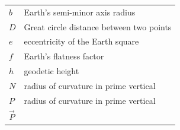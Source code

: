 \documentclass[
]{book}
\begin{document}
\begin{longtable}[]{@{}ll@{}}
\begin{minipage}[t]{0.43\columnwidth}
\(b\)\strut
\end{minipage} & \begin{minipage}[t]{0.51\columnwidth}\raggedright
Earth's semi-minor axis radius\strut
\end{minipage}\tabularnewline
\begin{minipage}[t]{0.43\columnwidth}\raggedright
\(D\)\strut
\end{minipage} & \begin{minipage}[t]{0.51\columnwidth}\raggedright
Great circle distance between two points\strut
\end{minipage}\tabularnewline
\begin{minipage}[t]{0.43\columnwidth}\raggedright
\(e\)\strut
\end{minipage} & \begin{minipage}[t]{0.51\columnwidth}\raggedright
eccentricity of the Earth square\strut
\end{minipage}\tabularnewline
\begin{minipage}[t]{0.43\columnwidth}\raggedright
\(f\)\strut
\end{minipage} & \begin{minipage}[t]{0.51\columnwidth}\raggedright
Earth's flatness factor\strut
\end{minipage}\tabularnewline
\begin{minipage}[t]{0.43\columnwidth}\raggedright
\(h\)\strut
\end{minipage} & \begin{minipage}[t]{0.51\columnwidth}\raggedright
geodetic height\strut
\end{minipage}\tabularnewline
\begin{minipage}[t]{0.43\columnwidth}\raggedright
\(N\)\strut
\end{minipage} & \begin{minipage}[t]{0.51\columnwidth}\raggedright
radius of curvature in prime vertical\strut
\end{minipage}\tabularnewline
\begin{minipage}[t]{0.43\columnwidth}\raggedright
\(P\)\strut
\end{minipage} & \begin{minipage}[t]{0.51\columnwidth}\raggedright
radius of curvature in prime vertical\strut
\end{minipage}\tabularnewline
\begin{minipage}[t]{0.43\columnwidth}\raggedright
\(\overset{\rightarrow}{P}\)\strut
\end{minipage} & \begin{minipage}[t]{0.51\columnwidth}\raggedright

\end{minipage}
\end{longtable}
\end{document}

